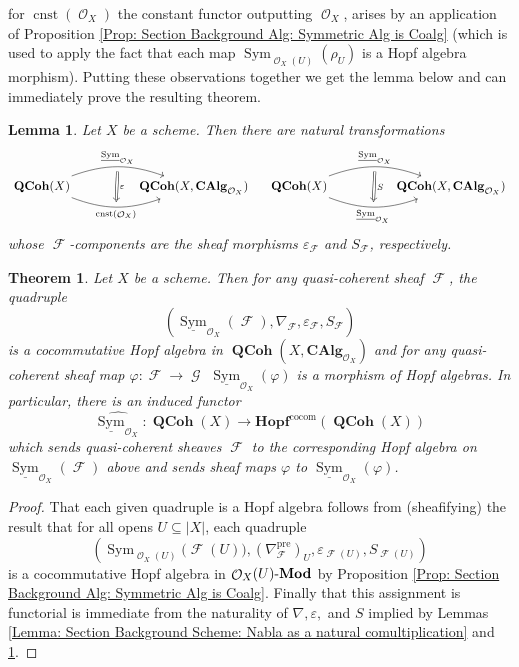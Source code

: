 \documentclass{amsart}
\newtheorem{Theorem}[equation]{Theorem}
\newtheorem{lemma}[equation]{Lemma}
\theoremstyle{definition}
\DeclareMathOperator{\Fscr}{\mathscr{F}}
\DeclareMathOperator{\Gscr}{\mathscr{G}}
\DeclareMathOperator{\Ocal}{\mathcal{O}}
\DeclareMathOperator{\sym}{Sym}
\newcommand{\CAlg}[1]{\mathbf{CAlg}_{#1}}
\newcommand{\Sym}[1]{\sym_{#1}}
\newcommand{\RelSym}[1]{\underline{\sym}_{{#1}}}
\let\epsilon\varepsilon
\DeclareMathOperator{\QCoh}{\mathbf{QCoh}}
\DeclareMathOperator{\cnst}{cnst}
\let\epsilon\varepsilon
\newcommand{\Mod}[1]{{#1}\textnormal{-}\mathbf{Mod}}
\numberwithin{equation}{subsection}
\begin{document}
for $\cnst(\Ocal_X)$ the constant functor outputting $\Ocal_X$, arises by an application of Proposition \ref{Prop: Section Background Alg: Symmetric Alg is Coalg} (which is used to apply the fact that each map $\Sym{\Ocal_X(U)}\!(\rho_U)$ is a Hopf algebra morphism). Putting these observations together we get the lemma below and can immediately prove the resulting theorem.
\begin{lemma}\label{Lemma: Section Background Scheme: Counit and Unit as natural transforms}
Let $X$ be a scheme. Then there are natural transformations
\[
\begin{tikzcd}
	\QCoh(X) \ar[rr, bend left = 20, ""{name = U}]{}{\RelSym{\Ocal_X}} \ar[rr, swap, bend right = 20, ""{name = D}]{}{\cnst(\Ocal_X)} & & \QCoh(X,\CAlg{\Ocal_X})
	\ar[from = U, to = D, Rightarrow, shorten <= 4pt, shorten >= 4pt]{}{\epsilon}
\end{tikzcd}\quad
\begin{tikzcd}
	\QCoh(X) \ar[rr, bend left = 20, ""{name = U}]{}{\RelSym{\Ocal_X}} \ar[rr, swap, bend right = 20, ""{name = D}]{}{\RelSym{\Ocal_X}} & & \QCoh(X,\CAlg{\Ocal_X})
	\ar[from = U, to = D, Rightarrow, shorten <= 4pt, shorten >= 4pt]{}{S}
\end{tikzcd}
\]
whose $\Fscr$-components are the sheaf morphisms $\epsilon_{\Fscr}$ and $S_{\Fscr}$, respectively.
\end{lemma}
\begin{Theorem}\label{Thm: Section Background Scheme: Hopf algebras for RelSym}
Let $X$ be a scheme. Then for any quasi-coherent sheaf $\Fscr$, the quadruple
\[
\left(\RelSym{\Ocal_X}(\Fscr), \nabla_{\Fscr}, \epsilon_{\Fscr}, S_{\Fscr}\right)
\]
is a cocommutative Hopf algebra in $\QCoh(X,\CAlg{\Ocal_X})$ and for any quasi-coherent sheaf map $\varphi:\Fscr \to \Gscr$ $\RelSym{\Ocal_X}(\varphi)$ is a morphism of Hopf algebras. In particular, there is an induced functor
\[
\widehat{\RelSym{\Ocal_X}}:\QCoh(X) \to \mathbf{Hopf}^{\operatorname{cocom}}(\QCoh(X))
\]
which sends quasi-coherent sheaves $\Fscr$ to the corresponding Hopf algebra on $\RelSym{\Ocal_X}(\Fscr)$ above and sends sheaf maps $\varphi$ to $\RelSym{\Ocal_X}(\varphi)$.
\end{Theorem}
\begin{proof}
That each given quadruple is a Hopf algebra follows from (sheafifying) the result that for all opens $U \subseteq \lvert X \rvert$, each quadruple
\[
\left(\Sym{\Ocal_X(U)}\!\big(\Fscr(U)\big), (\nabla_{\Fscr}^{\operatorname{pre}})_U, \epsilon_{\Fscr(U)}, S_{\Fscr(U)}\right)
\]
is a cocommutative Hopf algebra in $\Mod{\Ocal_X(U)}$ by Proposition \ref{Prop: Section Background Alg: Symmetric Alg is Coalg}. Finally that this assignment is functorial is immediate from the naturality of $\nabla, \epsilon,$ and $S$ implied by Lemmas \ref{Lemma: Section Background Scheme: Nabla as a natural comultiplication} and \ref{Lemma: Section Background Scheme: Counit and Unit as natural transforms}.
\end{proof}
\end{document}
